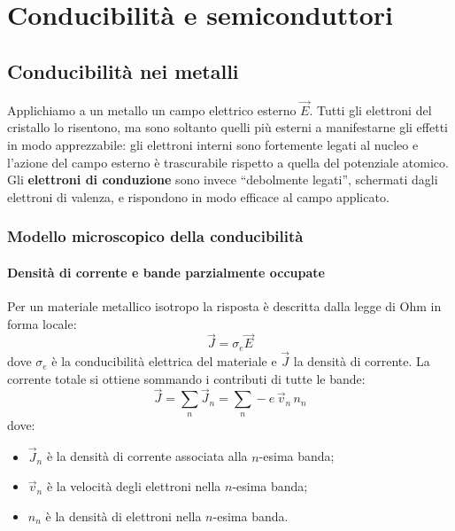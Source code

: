 \chapter{Conducibilità e semiconduttori}

\section{Conducibilità nei metalli}

Applichiamo a un metallo un campo elettrico esterno \( \vec{E} \). Tutti gli elettroni del cristallo lo risentono, ma sono soltanto quelli più esterni a manifestarne gli effetti in modo apprezzabile: gli elettroni interni sono fortemente legati al nucleo e l'azione del campo esterno è trascurabile rispetto a quella del potenziale atomico. Gli \textbf{elettroni di conduzione} sono invece ``debolmente legati'', schermati dagli elettroni di valenza, e rispondono in modo efficace al campo applicato.

\subsection{Modello microscopico della conducibilità}

\subsubsection{Densità di corrente e bande parzialmente occupate}

Per un materiale metallico isotropo la risposta è descritta dalla legge di Ohm in forma locale:
\begin{equation}
    \vec{J} = \sigma_e \vec{E}
\end{equation}
dove \( \sigma_e \) è la conducibilità elettrica del materiale e \( \vec{J} \) la densità di corrente. La corrente totale si ottiene sommando i contributi di tutte le bande:
\begin{equation}
    \vec{J} = \sum_n \vec{J}_n = \sum_n -e \, \vec{v}_n \, n_n
\end{equation}
dove:
\begin{itemize}
    \item \( \vec{J}_n \) è la densità di corrente associata alla \( n \)-esima banda;
    \item \( \vec{v}_n \) è la velocità degli elettroni nella \( n \)-esima banda;
    \item \( n_n \) è la densità di elettroni nella \( n \)-esima banda.
\end{itemize}

